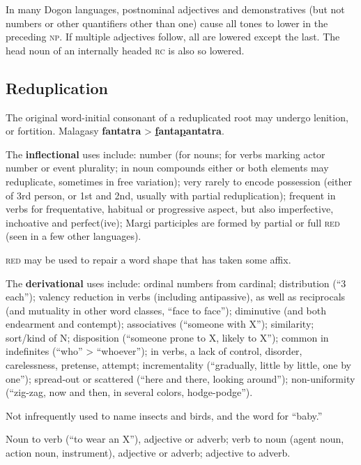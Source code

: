 \documentclass[11pt]{article}
\newcommand{\LL}[1]{\textbf{#1}}  %
\newcommand{\I}[1]{\textsc{#1}}   %
\begin{document}
In many Dogon languages, postnominal adjectives and demonstratives
(but not numbers or other quantifiers other than one) cause all tones
to lower in the preceding \I{np}.  If multiple adjectives follow, all
are lowered except the last. The head noun of an internally headed
\I{rc} is also so lowered.

\subsection{Reduplication} The original word-initial consonant of a
reduplicated root may undergo lenition, or fortition.  Malagasy
\LL{fantatra} > \LL{\uline{f}anta\uline{p}antatra}.

The \textbf{inflectional} uses include: number (for nouns; for verbs
marking actor number or event plurality; in noun compounds either or
both elements may reduplicate, sometimes in free variation); very
rarely to encode possession (either of 3rd person, or 1st and 2nd,
usually with partial reduplication); frequent in verbs for
frequentative, habitual or progressive aspect, but also imperfective,
inchoative and perfect(ive); Margi participles are formed by partial
or full \I{red} (seen in a few other languages).

\I{red} may be used to repair a word shape that has taken some affix.

The \textbf{derivational} uses include: ordinal numbers from cardinal;
distribution (``3 each''); valency reduction in verbs (including
antipassive), as well as reciprocals (and mutuality in other word
classes, ``face to face''); diminutive (and both endearment and
contempt); associatives (``someone with X''); similarity; sort/kind of
N; disposition (``someone prone to X, likely to X''); common in
indefinites (``who'' > ``whoever''); in verbs, a lack of control,
disorder, carelessness, pretense, attempt; incrementality
(``gradually, little by little, one by one''); spread-out or scattered
(``here and there, looking around''); non-uniformity (``zig-zag, now
and then, in several colors, hodge-podge'').

Not infrequently used to name insects and birds, and the word for
``baby.'' 

Noun to verb (``to wear an X''), adjective or adverb; verb to noun
(agent noun, action noun, instrument), adjective or adverb; adjective
to adverb.
\end{document}
